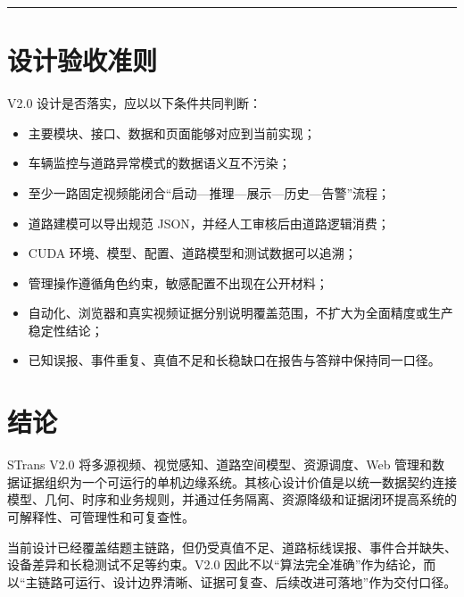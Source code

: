 \begin{center}\rule{0.5\linewidth}{0.5pt}\end{center}

\section{设计验收准则}\label{design-ux8bbeux8ba1ux9a8cux6536ux51c6ux5219}

V2.0 设计是否落实，应以以下条件共同判断：

\begin{itemize}
\tightlist
\item
  主要模块、接口、数据和页面能够对应到当前实现；
\item
  车辆监控与道路异常模式的数据语义互不污染；
\item
  至少一路固定视频能闭合``启动---推理---展示---历史---告警''流程；
\item
  道路建模可以导出规范 JSON，并经人工审核后由道路逻辑消费；
\item
  CUDA 环境、模型、配置、道路模型和测试数据可以追溯；
\item
  管理操作遵循角色约束，敏感配置不出现在公开材料；
\item
  自动化、浏览器和真实视频证据分别说明覆盖范围，不扩大为全面精度或生产稳定性结论；
\item
  已知误报、事件重复、真值不足和长稳缺口在报告与答辩中保持同一口径。
\end{itemize}

\section{结论}\label{design-ux7ed3ux8bba}

STrans V2.0 将多源视频、视觉感知、道路空间模型、资源调度、Web 管理和数据证据组织为一个可运行的单机边缘系统。其核心设计价值是以统一数据契约连接模型、几何、时序和业务规则，并通过任务隔离、资源降级和证据闭环提高系统的可解释性、可管理性和可复查性。

当前设计已经覆盖结题主链路，但仍受真值不足、道路标线误报、事件合并缺失、设备差异和长稳测试不足等约束。V2.0 因此不以``算法完全准确''作为结论，而以``主链路可运行、设计边界清晰、证据可复查、后续改进可落地''作为交付口径。

